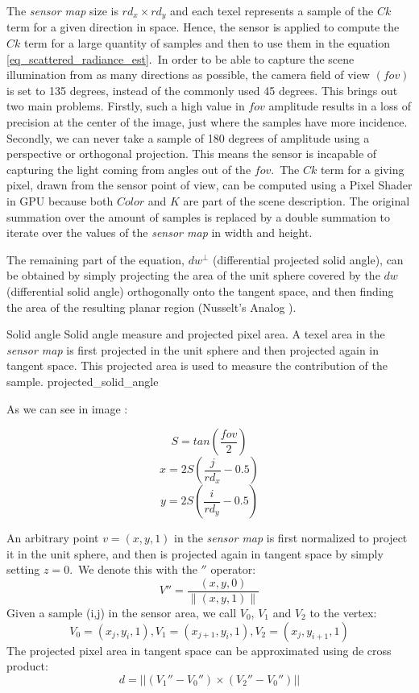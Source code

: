 \documentclass[10pt, conference]{IEEEtran}
\begin{document}
The \emph{sensor map} size is $rd_x \times rd_y$ and each texel represents a sample of the $Ck$ term for a given direction in space. Hence, the sensor is applied to compute the $Ck$ term for a large quantity of samples and then to use them in the equation \ref{eq_scattered_radiance_est}.\
In order to be able to capture the scene illumination from as many  directions as possible, the camera field of view $(fov)$ is set to 135 degrees, instead of the commonly used 45 degrees. This brings out two main problems. Firstly, such a high value in $fov$ amplitude results in a loss of precision at the center of the image, just where the samples have more incidence. Secondly, we can never take a sample of 180 degrees of amplitude using a perspective or orthogonal projection. This means the sensor is incapable of capturing the light coming from angles out of the $fov$.\
The $Ck$ term for a giving pixel, drawn from the sensor point of view, can be computed using a Pixel Shader in GPU because both $Color$ and $K$ are part of the scene description. The original summation over the amount of samples is replaced by a double summation to iterate over the values of the \emph{sensor map} in width and height.\

The remaining part of the equation, $dw^\perp$ (differential projected solid angle), can be obtained by simply projecting the area of the unit sphere 
covered by the $dw$ (differential solid angle) orthogonally onto the tangent space, and then finding the area of the resulting planar region (Nusselt's Analog \cite[p.~78]{monte_carlo_light_transport}).

\subimages
	{Solid angle Solid angle measure and projected pixel area. 
	A texel area in the \emph{sensor map} is first projected in the unit sphere and then projected again in tangent space. 
	This projected area is used to measure the contribution of the sample.}
	{projected_solid_angle}{
	\subimage[]{}{projected_solid_angle.png}%
}

As we can see in image :

\[ S = tan(\frac{fov}{2}) \]
\[ x = 2S(\frac{j}{rd_x} - 0.5) \]
\[ y = 2S(\frac{i}{rd_y} - 0.5) \]

An arbitrary point $v = (x,y,1)$ in the \emph{sensor map} is first normalized to project it in the unit sphere, and then is projected again in tangent space by simply setting $z = 0$.\
We denote this with the $''$ operator:\
\[ 
	V'' = \frac{(x, y, 0)} { \left\| (x,y,1) \right\| } 
\]
Given a sample (i,j) in the sensor area, we call $V_0$, $V_1$ and $V_2$ to the vertex:\
\[ 
	V_0 = (x_j, y_i, 1), V_1 = (x_{j+1}, y_i, 1), V_2 = (x_j, y_{i+1}, 1) 
\]
The projected pixel area in tangent space can be approximated using de cross product:\
\begin{equation}
	\label{eq_d}
	d = ||(V_1'' - V_0'') \times (V_2'' - V_0'')||
\end{equation}
\end{document}
